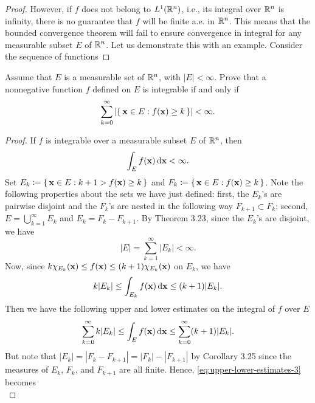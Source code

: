 \begin{proof}
However, if $f$ does not belong to $L^1(\mathbb{R}^n)$, i.e., its integral over
$\mathbb{R}^n$ is infinity, there is no guarantee that $f$ will be finite a.e.\@
in $\mathbb{R}^n$. This means that the bounded convergence theorem will fail to
ensure convergence in integral for any measurable subset $E$ of
$\mathbb{R}^n$. Let us demonstrate this with an example. Consider the sequence of
functions
\end{proof}

\begin{problem}
Assume that $E$ is a measurable set of $\mathbb{R}^n$, with
$|E|<\infty$. Prove that a nonnegative function $f$ defined
on $E$ is integrable if and only if
\[
\sum_{k=0}^\infty\left|\left\{\,\mathbf{x}\in E:f(\mathbf{x})\geq
    k\,\right\}\right|<\infty.
\]
\end{problem}
\begin{proof}
If $f$ is integrable over a measurable subset $E$ of $\mathbb{R}^n$, then
\begin{equation}
\label{eq:integrability-3}
\int_E f(\mathbf{x})\mathop{}\!\mathrm{d}\mathbf{x}<\infty.
\end{equation}
Set $E_k\coloneqq\left\{\,\mathbf{x}\in E:k+1>f(\mathbf{x})\geq k\,\right\}$ and
$F_k\coloneqq\left\{\,\mathbf{x}\in E:f(\mathbf{x})\geq k\,\right\}$. Note the
following properties about the sets we have just defined: first, the
$E_k$'s are pairwise disjoint and the $F_k$'s are nested in the following
way $F_{k+1}\subset F_k$; second, $E=\bigcup_{k=1}^\infty E_k$ and
$E_k=F_k\minus F_{k+1}$. By Theorem 3.23, since the $E_k$'s are disjoint,
we have
\begin{equation}
  \label{eq:disjoint-measurable-sets-3}
|E|=\sum_{k=1}^\infty|E_k|<\infty.
\end{equation}
Now, since $k\chi_{E_k}(\mathbf{x})\leq f(\mathbf{x})\leq (k+1)\chi_{E_k}(\mathbf{x})$ on
$E_k$, we have
\begin{equation}
\label{eq:estimates-E-k-3}
k|E_k|\leq\int_{E_k}f(\mathbf{x})\mathop{}\!\mathrm{d}\mathbf{x}\leq (k+1)|E_k|.
\end{equation}
Then we have the following upper and lower estimates on the integral of $f$
over $E$
\begin{equation}
\label{eq:upper-lower-estimates-3}
\sum_{k=0}^\infty k|E_k|\leq\int_E f(\mathbf{x})\mathop{}\!\mathrm{d}\mathbf{x}\leq\sum_{k=0}^\infty(k+1)|E_k|.
\end{equation}
But note that $|E_k|=|F_k\minus F_{k+1}|=|F_k|-|F_{k+1}|$ by Corollary 3.25
since the measures of $E_k$, $F_k$, and $F_{k+1}$ are all finite. Hence,
\eqref{eq:upper-lower-estimates-3} becomes
\begin{equation}
\label{eq:new-upper-lower-estimates-3}

\end{equation}
\end{proof}

